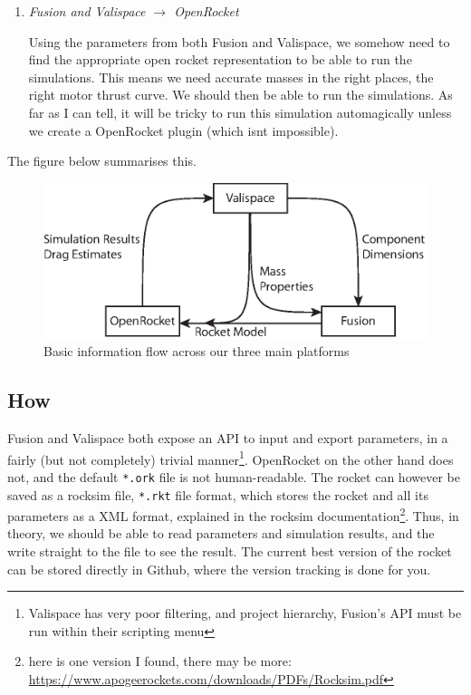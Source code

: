 \documentclass[12pt]{article}
\begin{document}
\begin{enumerate}
\item \emph{ Fusion and Valispace $\rightarrow$ OpenRocket}

Using the parameters from both Fusion and Valispace, we somehow need to find the appropriate open rocket representation to be able to run the simulations. This means we need accurate masses in the right places, the right motor thrust curve. We should then be able to run the simulations. As far as I can tell, it will be tricky to run this simulation automagically unless we create a OpenRocket plugin (which isnt impossible). 



\end{enumerate}

The figure below summarises this. 

\begin{figure}[htbp]
   \centering
   \includegraphics[width=0.7\linewidth]{software_workflow.eps}
   \caption{Basic information flow across our three main platforms}
   \label{fig:}
\end{figure}


\subsection{How}

Fusion and Valispace both expose an API to input and export parameters, in a fairly (but not completely) trivial manner\footnote{Valispace has very poor filtering, and project hierarchy, Fusion's API must be run within their scripting menu}.  OpenRocket on the other hand does not, and the default \texttt{*.ork} file is not human-readable. The rocket can however be saved as a rocksim file, \texttt{*.rkt} file format, which stores the rocket and all its parameters as a XML format, explained in the rocksim documentation\footnote{ here is one version I found, there may be more: \url{https://www.apogeerockets.com/downloads/PDFs/Rocksim.pdf}}. Thus, in theory, we should be able to read parameters and simulation results, and the write straight to the file to see the result. The current best version of the rocket can be stored directly in Github, where the version tracking is done for you. 
\end{document}
